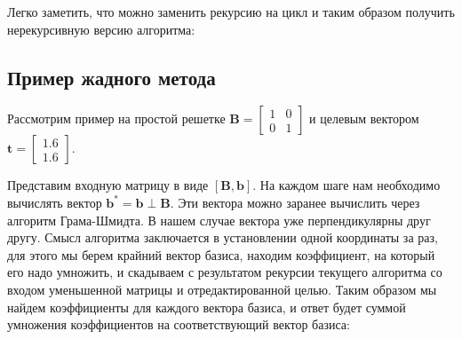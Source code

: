 Легко заметить, что можно заменить рекурсию на цикл и таким образом получить нерекурсивную версию алгоритма:

\begin{algorithmic}

\EndFor
\end{algorithmic}

\subsection{Пример жадного метода}

Рассмотрим пример на простой решетке $ \mathbf{B} = \left[\begin{array}{cccc}
1 & 0 \\
0 & 1
\end{array}\right] $ и целевым вектором $ \mathbf{t} = \left[\begin{array}{cccc}
1.6 \\
1.6
\end{array}\right] $.

Представим входную матрицу в виде $ \left[\mathbf{B}, \mathbf{b}\right] $. На каждом шаге нам необходимо вычислять вектор $ \mathbf{b}^* = \mathbf{b} \perp \mathbf{B} $. Эти вектора можно заранее вычислить через алгоритм Грама-Шмидта. В нашем случае вектора уже перпендикулярны друг другу. Смысл алгоритма заключается в установлении одной координаты за раз, для этого мы берем крайний вектор базиса, находим коэффициент, на который его надо умножить, и скадываем с результатом рекурсии текущего алгоритма со входом уменьшенной матрицы и отредактированной целью. Таким образом мы найдем коэффициенты для каждого вектора базиса, и ответ будет суммой умножения коэффициентов на соответствующий вектор базиса:

